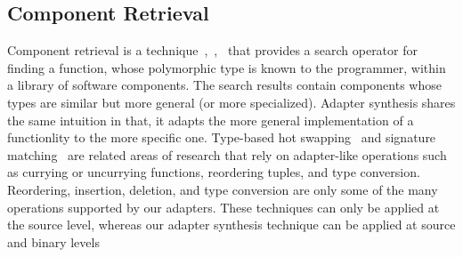 \subsection{Component Retrieval}
%
Component retrieval is a technique~\cite{rittri},~\cite{runciman1989},~\cite{runciman1991} that provides a
search operator for finding a function, whose polymorphic type is known to the programmer, within a library of software components. 
%
The search results contain components whose types are similar but more general (or more specialized). 
%
Adapter synthesis shares the same intuition in that, it adapts the more
general implementation of a functionlity to the more specific one.
%
Type-based hot swapping~\cite{duggan} and signature
matching~\cite{zaremski} are related areas of research that rely on adapter-like operations such as currying or uncurrying functions, reordering tuples, and type conversion.
%
Reordering, insertion, deletion, and type conversion are only some of the many operations supported by our adapters. 
%
These techniques can only be applied at the source level, whereas our adapter synthesis technique can be applied at source and binary levels
%  
%  
%  
